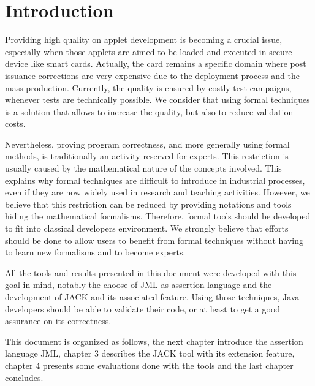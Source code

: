 \chapter{Introduction}
Providing high quality on applet development is becoming a crucial issue, 
especially when those applets are aimed to be loaded and executed in secure device like smart cards.  
Actually, the card remains a specific domain where post issuance corrections are very expensive due to the deployment process and the mass production.
Currently, the quality is ensured by costly test campaigns, 
whenever tests are technically possible. 
We consider that using formal techniques is a solution that allows to increase the quality, but also to reduce validation costs.

Nevertheless, proving program correctness, and more generally using
formal methods, is traditionally an activity reserved for experts.  
This restriction is usually caused by the mathematical nature of the concepts involved.
This explains why formal techniques are difficult to introduce in industrial processes, even if they are now widely used in research and teaching activities.
However, we believe that this restriction can be reduced by providing notations and tools hiding the mathematical formalisms.
Therefore, formal tools should be developed to fit into classical developers environment.
We strongly believe that efforts should be done to allow users to benefit from formal techniques without having to learn new formalisms and to become experts.

All the tools and results presented in this document were developed with this goal in mind, notably the choose of JML as assertion language and the development of JACK and its associated feature.
Using those techniques, Java developers should be able to validate their code, or at least to get a good assurance on its correctness.

This document is organized as follows, the next chapter introduce the assertion language JML, chapter 3 describes the JACK tool with its extension feature, chapter 4 presents some evaluations done with the tools and the last chapter concludes.
